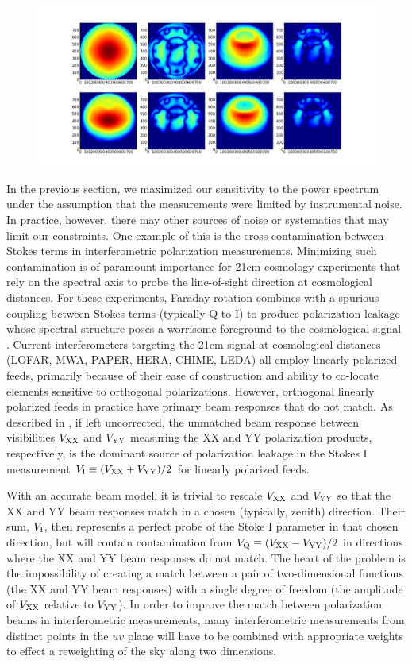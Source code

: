 \documentclass[twocolumn,apj,numberedappendix]{emulateapj}
\begin{document}
\begin{figure}\centering
\includegraphics[width=.9\columnwidth]{plots/fringe_beam_wgts.png}
\caption{
}\label{fig:fringe_beam_wgts}
\end{figure}

In the previous section, we maximized our sensitivity to the power spectrum under the assumption that the measurements were limited by instrumental noise. In practice, however, there may other sources of noise or systematics that may limit our constraints. One example of this is the cross-contamination between Stokes terms in interferometric polarization measurements. Minimizing such contamination is of paramount importance for 21cm cosmology experiments that rely on
the spectral axis to probe the line-of-sight direction at cosmological distances.  For these
experiments, Faraday rotation combines
with a spurious coupling between Stokes terms (typically Q to I) to produce polarization leakage whose 
spectral structure poses a worrisome foreground
to the cosmological signal \citep{jelic_et_al2008,moore_et_al2013,moore_et_al2015}.  Current interferometers
targeting the 21cm signal at cosmological distances (LOFAR, MWA, PAPER, HERA, CHIME, LEDA) all employ linearly
polarized feeds, primarily because of their ease of construction and ability to co-locate elements sensitive to
orthogonal polarizations.  However, orthogonal linearly polarized feeds in practice have primary beam responses
that do not match.  As described in \citet{moore_et_al2013}, if left uncorrected, the unmatched beam response 
between visibilities ${V_{\rm XX}}$ and ${V_{\rm YY}}$ measuring the XX and YY polarization products, respectively, is the 
dominant source of polarization leakage in the Stokes I measurement ${V_{\rm I}}\equiv({V_{\rm XX}}+{V_{\rm YY}})/2$ for
linearly polarized feeds.

With an accurate beam model, it is trivial to rescale ${V_{\rm XX}}$ and ${V_{\rm YY}}$ 
so that the XX and YY beam responses match in a chosen (typically, zenith) direction.  Their sum, ${V_{\rm I}}$, then
represents a perfect probe of the Stoke I parameter in that chosen direction, but will contain contamination
from ${V_{\rm Q}}\equiv({V_{\rm XX}}-{V_{\rm YY}})/2$ in directions where the XX and YY beam responses do not match.
The heart of the problem is the impossibility of creating a match between a pair of two-dimensional functions (the
XX and YY beam responses) with a single degree of freedom (the amplitude of ${V_{\rm XX}}$ relative to ${V_{\rm YY}}$).  In order
to improve the match between polarization beams in interferometric measurements, many interferometric measurements
from distinct points in the $uv$ plane will have to be combined with appropriate weights to effect a reweighting
of the sky along two dimensions.
\end{document}
